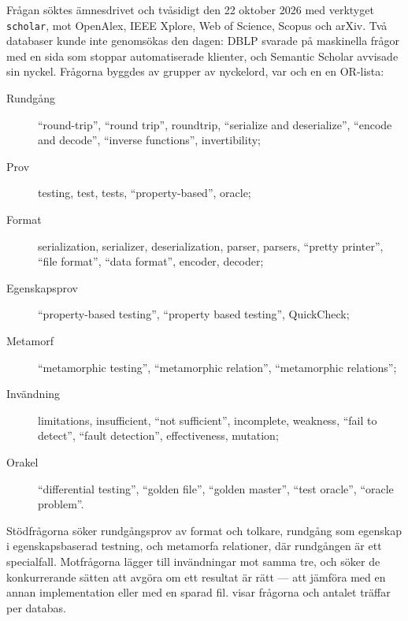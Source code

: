 Frågan söktes ämnesdrivet och tvåsidigt den 22 oktober 2026 med
verktyget \texttt{scholar}, mot OpenAlex, IEEE Xplore, Web of Science,
Scopus och arXiv.  Två databaser kunde inte genomsökas den dagen: DBLP
svarade på maskinella frågor med en sida som stoppar automatiserade
klienter, och Semantic Scholar avvisade sin nyckel.  Frågorna byggdes av
grupper av nyckelord, var och en en OR-lista:
\begin{description}
  \item[Rundgång] \enquote{round-trip}, \enquote{round trip}, roundtrip,
    \enquote{serialize and deserialize}, \enquote{encode and decode},
    \enquote{inverse functions}, invertibility;
  \item[Prov] testing, test, tests, \enquote{property-based}, oracle;
  \item[Format] serialization, serializer, deserialization, parser,
    parsers, \enquote{pretty printer}, \enquote{file format},
    \enquote{data format}, encoder, decoder;
  \item[Egenskapsprov] \enquote{property-based testing},
    \enquote{property based testing}, QuickCheck;
  \item[Metamorf] \enquote{metamorphic testing}, \enquote{metamorphic
    relation}, \enquote{metamorphic relations};
  \item[Invändning] limitations, insufficient, \enquote{not sufficient},
    incomplete, weakness, \enquote{fail to detect}, \enquote{fault
    detection}, effectiveness, mutation;
  \item[Orakel] \enquote{differential testing}, \enquote{golden file},
    \enquote{golden master}, \enquote{test oracle}, \enquote{oracle
    problem}.
\end{description}
Stödfrågorna söker rundgångsprov av format och tolkare, rundgång som
egenskap i egenskapsbaserad testning, och metamorfa relationer, där
rundgången är ett specialfall.  Motfrågorna lägger till invändningar mot
samma tre, och söker de konkurrerande sätten att avgöra om ett resultat
är rätt --- att jämföra med en annan implementation eller med en sparad
fil.   visar frågorna och antalet
träffar per databas.

